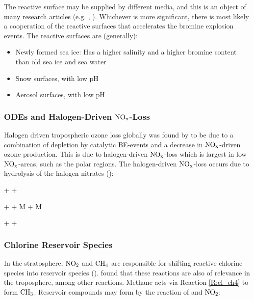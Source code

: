 The reactive surface may be supplied by different media, and this is an object of many research articles (e.g.  \cite{Simpson2018}, \cite{Rankin}). Whichever is more significant, there is most likely a cooperation of the reactive surfaces that accelerates the bromine explosion events. The reactive surfaces are (generally): 

\begin{itemize}
    \item Newly formed sea ice: Has a higher salinity and a higher bromine content than old sea ice and sea water \cite{Rankin}
    \item Snow surfaces, with low pH
    \item Aerosol surfaces, with low pH
\end{itemize}

\subsubsection{ODEs and Halogen-Driven $\mathrm{NO_x}$-Loss}

Halogen driven tropospheric ozone loss globally was found by \cite{Schmidt} to be due to a combination of depletion by catalytic BE-events and a decrease in $\mathrm{NO_x}$-driven ozone production. This is due to halogen-driven $\mathrm{NO_x}$-loss which is largest in low $\mathrm{NO_x}$-areas, such as the polar regions. The halogen-driven $\mathrm{NO_x}$-loss occurs due to hydrolysis of the halogen nitrates (\cite{Schmidt}):

\begin{reaction}
     +  \rightarrow {} + 
    \label{R:14}
\end{reaction}


\begin{reaction}
     +  + M \rightarrow {} + M
    \label{R:9}
\end{reaction}


\begin{reaction}
     +    + 
    \label{R:13}
\end{reaction}




\subsubsection{Chlorine Reservoir Species}

In the stratosphere, $\mathrm{NO_2}$ and $\mathrm{CH_4}$ are responsible for shifting reactive chlorine species into reservoir species (\cite{SeinfeldSpyros}). \cite{Wang_2019} found that these reactions are also of relevance in the troposphere, among other reactions. Methane acts via Reaction \ref{R:cl_ch4} to form $\mathrm{CH_3}$. Reservoir compounds may form by the reaction of  and $\mathrm{NO_2}$: 

